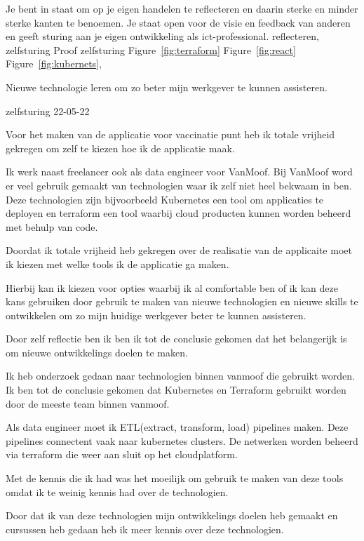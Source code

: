 \competentie
{%
	\competentieformulier
	{%
		Je bent in staat om op je eigen handelen te reflecteren
		en daarin sterke en minder sterke kanten te
		benoemen. Je staat open voor de visie en feedback
		van anderen en geeft sturing aan je eigen ontwikkeling
		als ict-professional.
	}
	{%
		reflecteren,
		zelfsturing
	}
	{%
		Proof
	}
	{%
		zelfsturing
	}
	{%
		Figure~\ref{fig:terraform}
		Figure~\ref{fig:react}
		Figure~\ref{fig:kubernets},
	}
}
{%
	\bewijs
	{
		Nieuwe technologie leren om zo beter mijn werkgever te kunnen assisteren.
	}
	{%
		\starr
		{%
			zelfsturing
		}
		{%
			22-05-22
		}
		{%
			Voor het maken van de applicatie voor vaccinatie punt heb ik totale vrijheid gekregen om zelf te kiezen hoe ik de applicatie maak.

			Ik werk naast freelancer ook als data engineer voor VanMoof.
			Bij VanMoof word er veel gebruik gemaakt van technologien waar ik zelf niet heel bekwaam in ben.
			Deze technologien zijn bijvoorbeeld Kubernetes een tool om applicaties te deployen en terraform een tool waarbij cloud producten kunnen worden beheerd met behulp van code.
		}
		{%
			Doordat ik totale vrijheid heb gekregen over de realisatie van de applicaite moet ik kiezen met welke tools ik de applicatie ga maken.


			Hierbij kan ik kiezen voor opties waarbij ik al comfortable ben of ik kan deze kans gebruiken door gebruik te maken van nieuwe technologien en nieuwe skills te ontwikkelen om zo mijn huidige werkgever beter te kunnen assisteren.

			Door zelf reflectie ben ik ben ik tot de conclusie gekomen dat het belangerijk is om nieuwe ontwikkelings doelen te maken.

		}
		{%
			Ik heb onderzoek gedaan naar technologien binnen vanmoof die gebruikt worden.
			Ik ben tot de conclusie gekomen dat Kubernetes en Terraform gebruikt worden door de meeste team binnen vanmoof.

			Als data engineer moet ik ETL(extract, transform, load) pipelines maken. Deze pipelines connectent vaak naar kubernetes clusters.
			De netwerken worden beheerd via terraform die weer aan sluit op het cloudplatform.

			Met de kennis die ik had was het moeilijk om gebruik te maken van deze tools omdat ik te weinig kennis had over de technologien.

			Door dat ik van deze technologien mijn ontwikkelings doelen heb gemaakt en cursussen heb gedaan heb ik meer kennis over deze technologien.

}}}
